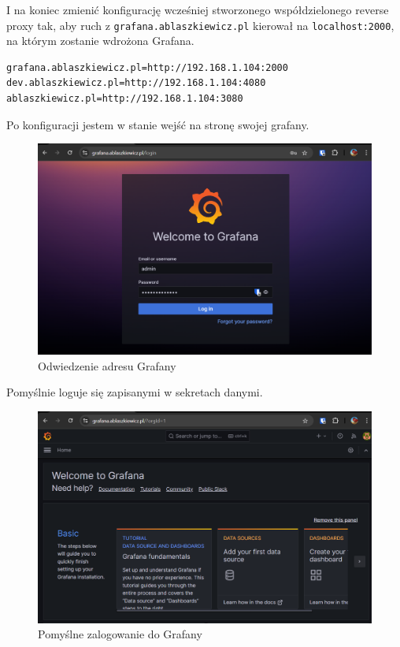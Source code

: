 \documentclass{article}
\begin{document}
I na koniec zmienić konfigurację wcześniej stworzonego współdzielonego reverse proxy tak, aby ruch z \lstinline|grafana.ablaszkiewicz.pl| kierował na \lstinline|localhost:2000|, na którym zostanie wdrożona Grafana.

\begin{lstlisting}[caption=Zaktualizowany plik \texttt{infrastructure/reverse-proxy-shared/config}]
grafana.ablaszkiewicz.pl=http://192.168.1.104:2000
dev.ablaszkiewicz.pl=http://192.168.1.104:4080
ablaszkiewicz.pl=http://192.168.1.104:3080
\end{lstlisting}

Po konfiguracji jestem w stanie wejść na stronę swojej grafany.

\begin{figure}[H]
    \centering
    \includegraphics[width=0.75\linewidth]{grafanaLogowanie.png}
    \caption{Odwiedzenie adresu Grafany}
    \label{fig:enter-label}
\end{figure}

Pomyślnie loguje się zapisanymi w sekretach danymi.

\begin{figure}[H]
    \centering
    \includegraphics[width=0.75\linewidth]{grafanaPomyslneZalogowanie.png}
    \caption{Pomyślne zalogowanie do Grafany}
    \label{fig:enter-label}
\end{figure}
\end{document}

